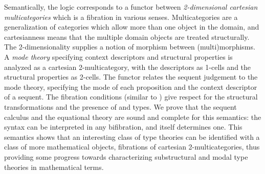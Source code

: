 Semantically, the logic corresponds to a functor between
\emph{2-dimensional cartesian multicategories} which is a fibration in
various senses.  Multicategories are a generalization of categories
which allow more than one object in the domain, and cartesianness means
that the multiple domain objects are treated structurally.  The
2-dimensionality supplies a notion of morphism between (multi)morphisms.
A \emph{mode theory} specifying context descriptors and structural
properties is analyzed as a cartesian 2-multicategory, with the
descriptors as 1-cells and the structural properties as 2-cells.  The
functor relates the sequent judgement to the mode theory, specifying the
mode of each proposition and the context descriptor of a sequent.  The
fibration conditions (similar to
\citep{hermida02fibrations,hormann15multicategories}) give respect for
the structural transformations and the presence of  and 
types.  We prove that the sequent calculus and the equational theory are
sound and complete for this semantics: the syntax can be interpreted in
any bifibration, and itself determines one.  This semantics shows that
an interesting class of type theories can be identified with a class of
more mathematical objects, fibrations of cartesian 2-multicategories,
thus providing some progress towards characterizing substructural
and modal type theories in mathematical terms.


 
